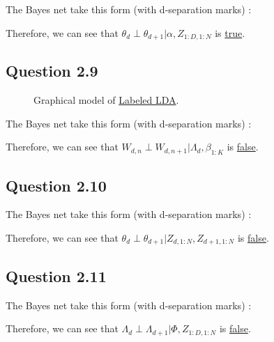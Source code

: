 \documentclass{article}
\begin{document}
The Bayes net take this form (with d-separation marks) :
\begin{figure}[H]
    \centering
    
    \label{fig:fig1.2.8}
\end{figure}

Therefore, we can see that $\theta_{d} \perp \theta_{d+1} | \alpha, Z_{1:D,1:N}$ is \underline{true}.

\subsection*{Question 2.9}

\begin{figure}[H]
    \centering
    
    \caption{Graphical model of \href{https://aclanthology.org/D09-1026.pdf}{Labeled LDA}.}
    \label{fig:fig2}
\end{figure}

The Bayes net take this form (with d-separation marks) :
\begin{figure}[H]
    \centering
    
    \label{fig:fig1.2.9}
\end{figure}

Therefore, we can see that $W_{d,n} \perp W_{d,n+1} | \Lambda_d, \beta_{1:K}$ is \underline{false}.

\subsection*{Question 2.10}

The Bayes net take this form (with d-separation marks) :
\begin{figure}[H]
    \centering
    
    \label{fig:fig1.2.10}
\end{figure}

Therefore, we can see that $\theta_{d} \perp \theta_{d+1} | Z_{d,1:N}, Z_{d+1,1:N}$ is \underline{false}.

\subsection*{Question 2.11}

The Bayes net take this form (with d-separation marks) :
\begin{figure}[H]
    \centering
    
    \label{fig:fig1.2.11}
\end{figure}

Therefore, we can see that $\Lambda_{d} \perp \Lambda_{d+1} | \Phi, Z_{1:D,1:N}$ is \underline{false}.
\end{document}
